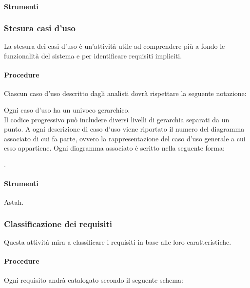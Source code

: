 \paragraph{Strumenti}



\subsubsection{Stesura casi d'uso}
La stesura dei casi d'uso è un'attività utile ad comprendere più a fondo le funzionalità del sistema e per identificare requisiti impliciti.
\paragraph{Procedure}

Ciascun caso d'uso descritto dagli analisti dovrà rispettare la seguente notazione:
\begin{center}
\end{center}
Ogni caso d'uso ha un  univoco gerarchico.\\
Il codice progressivo può includere diversi livelli di gerarchia separati da un punto.
A ogni descrizione di caso d'uso viene riportato il numero del diagramma associato di cui fa parte, ovvero la rappresentazione del caso d'uso generale a cui esso appartiene.
Ogni diagramma associato è scritto nella seguente forma:
\begin{center}
.
\end{center}

\paragraph{Strumenti}
Astah.



\subsubsection{Classificazione dei requisiti}
Questa attività mira a classificare i requisiti in base alle loro caratteristiche.

\paragraph{Procedure}
Ogni requisito andrà catalogato secondo il seguente schema:


